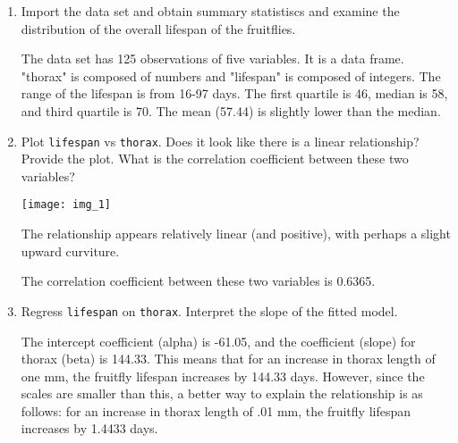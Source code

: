 \documentclass[12pt,letterpaper]{article}
\begin{document}
\begin{enumerate}
	
	\item
	Import the data set and obtain summary statistiscs and examine the distribution of the overall lifespan of the fruitflies.  
	\vspace{.2cm}
	


The data set has 125 observations of five variables. It is a data frame. "thorax" is composed of numbers and "lifespan" is composed of integers. The range of the lifespan is from 16-97 days. The first quartile is 46, median is 58, and third quartile is 70. The mean (57.44) is slightly lower than the median.
	\vspace{1cm}

	\item
	Plot \texttt{lifespan} vs \texttt{thorax}. Does it look like there is a linear relationship? Provide the plot. What is the correlation coefficient between these two variables?
	\vspace{.2cm}
	


\graphicspath{ {./Images/} }

\texttt{[image: img\_1]}

The relationship appears relatively linear (and positive), with perhaps a slight upward curviture.



The correlation coefficient between these two variables is 0.6365.
		\vspace{1cm}
		
	\item
	Regress \texttt{lifespan} on \texttt{thorax}.  Interpret the slope of the fitted model.
	\vspace{.2cm}
	


The intercept coefficient (alpha) is -61.05, and the coefficient (slope) for thorax (beta) is 144.33. This means that for an increase in thorax length of one mm, the fruitfly lifespan increases by 144.33 days. However, since the scales are smaller than this, a better way to explain the relationship is as follows: for an increase in thorax length of .01 mm, the fruitfly lifespan increases by 1.4433 days.
			\vspace{1cm}
			

\end{enumerate}
\end{document}
